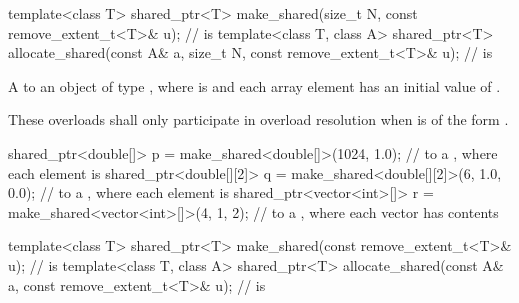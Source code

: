 %
%
\begin{itemdecl}
template<class T>
  shared_ptr<T> make_shared(size_t N,
                            const remove_extent_t<T>& u);       //  is 
template<class T, class A>
  shared_ptr<T> allocate_shared(const A& a, size_t N,
                                const remove_extent_t<T>& u);   //  is 
\end{itemdecl}

\begin{itemdescr}
\pnum
\returns A  to an object of type ,
where  is  and
each array element has an initial value of .

\pnum
\remarks These overloads shall only participate in overload resolution
when  is of the form .

\pnum
\begin{example}
\begin{codeblock}
shared_ptr<double[]> p = make_shared<double[]>(1024, 1.0);
  //  to a , where each element is 
shared_ptr<double[][2]> q = make_shared<double[][2]>(6, {1.0, 0.0});
  //  to a , where each  element is 
shared_ptr<vector<int>[]> r = make_shared<vector<int>[]>(4, {1, 2});
  //  to a , where each vector has contents 
\end{codeblock}
\end{example}
\end{itemdescr}

%
%
\begin{itemdecl}
template<class T>
  shared_ptr<T> make_shared(const remove_extent_t<T>& u);       //  is 
template<class T, class A>
  shared_ptr<T> allocate_shared(const A& a,
                                const remove_extent_t<T>& u);   //  is 
\end{itemdecl}

